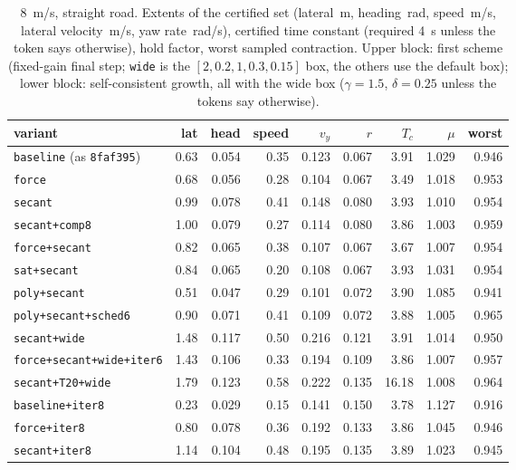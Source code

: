 \documentclass[11pt]{article}
\begin{document}
\begin{table}
\centering\footnotesize
\caption{8~m/s, straight road. Extents of the certified set
(lateral~m, heading~rad, speed~m/s, lateral velocity~m/s, yaw rate~rad/s),
certified time constant (required 4~s unless the token says otherwise),
hold factor, worst sampled contraction. Upper block: first scheme
(fixed-gain final step; \texttt{wide} is the $[2,0.2,1,0.3,0.15]$ box, the
others use the default box); lower block: self-consistent growth, all with
the wide box ($\gamma=1.5$, $\delta=0.25$ unless the tokens say otherwise).}
\label{tab:eight}
\begin{tabular}{lrrrrrrrr}
\toprule
variant & lat & head & speed & $v_y$ & $r$ & $T_c$ & $\mu$ & worst \\
\midrule
\texttt{baseline} (as \texttt{8faf395}) & 0.63 & 0.054 & 0.35 & 0.123 & 0.067 & 3.91 & 1.029 & 0.946 \\
\texttt{force} & 0.68 & 0.056 & 0.28 & 0.104 & 0.067 & 3.49 & 1.018 & 0.953 \\
\texttt{secant} & 0.99 & 0.078 & 0.41 & 0.148 & 0.080 & 3.93 & 1.010 & 0.954 \\
\texttt{secant{+}comp8} & 1.00 & 0.079 & 0.27 & 0.114 & 0.080 & 3.86 & 1.003 & 0.959 \\
\texttt{force{+}secant} & 0.82 & 0.065 & 0.38 & 0.107 & 0.067 & 3.67 & 1.007 & 0.954 \\
\texttt{sat{+}secant} & 0.84 & 0.065 & 0.20 & 0.108 & 0.067 & 3.93 & 1.031 & 0.954 \\
\texttt{poly{+}secant} & 0.51 & 0.047 & 0.29 & 0.101 & 0.072 & 3.90 & 1.085 & 0.941 \\
\texttt{poly{+}secant{+}sched6} & 0.90 & 0.071 & 0.41 & 0.109 & 0.072 & 3.88 & 1.005 & 0.965 \\
\texttt{secant{+}wide} & 1.48 & 0.117 & 0.50 & 0.216 & 0.121 & 3.91 & 1.014 & 0.950 \\
\texttt{force{+}secant{+}wide{+}iter6} & 1.43 & 0.106 & 0.33 & 0.194 & 0.109 & 3.86 & 1.007 & 0.957 \\
\texttt{secant{+}T20{+}wide} & 1.79 & 0.123 & 0.58 & 0.222 & 0.135 & 16.18 & 1.008 & 0.964 \\
\midrule
\texttt{baseline{+}iter8} & 0.23 & 0.029 & 0.15 & 0.141 & 0.150 & 3.78 & 1.127 & 0.916 \\
\texttt{force{+}iter8} & 0.80 & 0.078 & 0.36 & 0.192 & 0.133 & 3.86 & 1.045 & 0.946 \\
\texttt{secant{+}iter8} & 1.14 & 0.104 & 0.48 & 0.195 & 0.135 & 3.89 & 1.023 & 0.945 \\

\end{tabular}
\end{table}
\end{document}
